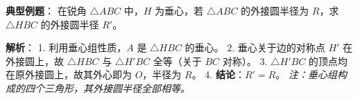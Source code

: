 \begin{examplebox}
\textbf{典型例题}：
在锐角 $\triangle ABC$ 中，$H$ 为垂心，若 $\triangle ABC$ 的外接圆半径为 $R$，求 $\triangle HBC$ 的外接圆半径 $R'$。

\textbf{解析}：
1. 利用垂心组性质，$A$ 是 $\triangle HBC$ 的垂心。
2. 垂心关于边的对称点 $H'$ 在外接圆上，故 $\triangle HBC$ 与 $\triangle H'BC$ 全等（关于 $BC$ 对称）。
3. $\triangle H'BC$ 的顶点均在原外接圆上，故其外心即为 $O$，半径为 $R$。
4. \textbf{结论}：$R' = R$。
\textit{注：垂心组构成的四个三角形，其外接圆半径全部相等。}
\end{examplebox}